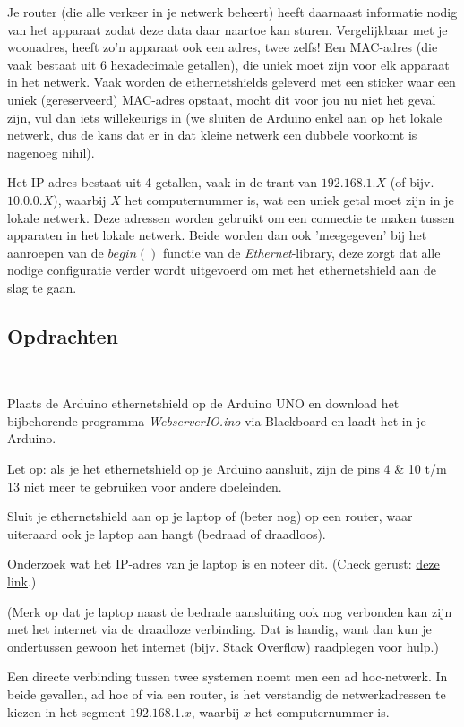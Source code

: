 Je router (die alle verkeer in je netwerk beheert) heeft daarnaast informatie nodig van het apparaat zodat deze data daar naartoe kan sturen. Vergelijkbaar met je woonadres, heeft zo'n apparaat ook een adres, twee zelfs! Een MAC-adres (die vaak bestaat uit 6 hexadecimale getallen), die uniek moet zijn voor elk apparaat in het netwerk. Vaak worden de ethernetshields geleverd met een sticker waar een uniek (gereserveerd) MAC-adres opstaat, mocht dit voor jou nu niet het geval zijn, vul dan iets willekeurigs in (we sluiten de Arduino enkel aan op het lokale netwerk, dus de kans dat er in dat kleine netwerk een dubbele voorkomt is nagenoeg nihil). 

Het IP-adres bestaat uit 4 getallen, vaak in de trant van $192.168.1.X$ (of bijv. $10.0.0.X$), waarbij $X$ het computernummer is, wat een uniek getal moet zijn in je lokale netwerk. Deze adressen worden gebruikt om een connectie te maken tussen apparaten in het lokale netwerk. Beide worden dan ook 'meegegeven' bij het aanroepen van de $begin()$ functie van de \textit{Ethernet}-library, deze zorgt dat alle nodige configuratie verder wordt uitgevoerd om met het ethernetshield aan de slag te gaan.

\subsection{Opdrachten}
\ 

\begin{exercise}
Plaats de Arduino ethernetshield op de Arduino UNO en download het bijbehorende programma \textit{WebserverIO.ino} via Blackboard en laadt het in je Arduino.
\end{exercise}

\begin{remark}
Let op: als je het ethernetshield op je Arduino aansluit, zijn de pins 4 \& 10 t/m 13 niet meer te gebruiken voor andere doeleinden.
\end{remark}

\begin{exercise}
Sluit je ethernetshield aan op je laptop of (beter nog) op een router, waar uiteraard ook je laptop aan hangt (bedraad of draadloos).

Onderzoek wat het IP-adres van je laptop is en noteer dit. (Check gerust: \href{https://support.microsoft.com/en-us/windows/find-your-ip-address-in-windows-f21a9bbc-c582-55cd-35e0-73431160a1b9#Category=Windows_10}{deze link}.)

(Merk op dat je laptop naast de bedrade aansluiting ook nog verbonden kan zijn met het internet via de draadloze verbinding. Dat is handig, want dan kun je ondertussen gewoon het internet (bijv. Stack Overflow) raadplegen voor hulp.)  

Een directe verbinding tussen twee systemen noemt men een ad hoc-netwerk. In beide gevallen, ad hoc of via een router, is het verstandig de netwerkadressen te kiezen in het segment $192.168.1.x$, waarbij $x$ het computernummer is. 
\end{exercise}

